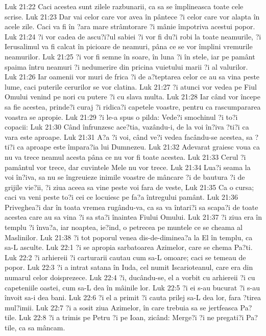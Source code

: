 Luk 21:22  Caci acestea sunt zilele razbunarii, ca sa se împlineasca toate cele scrise.
Luk 21:23  Dar vai celor care vor avea în pântece ?i celor care vor alapta în acele zile. Caci va fi în ?ara mare strâmtorare ?i mânie împotriva acestui popor.
Luk 21:24  ?i vor cadea de ascu?i?ul sabiei ?i vor fi du?i robi la toate neamurile, ?i Ierusalimul va fi calcat în picioare de neamuri, pâna ce se vor împlini vremurile neamurilor.
Luk 21:25  ?i vor fi semne în soare, în luna ?i în stele, iar pe pamânt spaima întru neamuri ?i nedumerire din pricina vuietului marii ?i al valurilor.
Luk 21:26  Iar oamenii vor muri de frica ?i de a?teptarea celor ce au sa vina peste lume, caci puterile cerurilor se vor clatina.
Luk 21:27  ?i atunci vor vedea pe Fiul Omului venind pe nori cu putere ?i cu slava multa.
Luk 21:28  Iar când vor începe sa fie acestea, prinde?i curaj ?i ridica?i capetele voastre, pentru ca rascumpararea voastra se apropie.
Luk 21:29  ?i le-a spus o pilda: Vede?i smochinul ?i to?i copacii:
Luk 21:30  Când înfrunzesc ace?tia, vazându-i, de la voi în?iva ?ti?i ca vara este aproape.
Luk 21:31  A?a ?i voi, când ve?i vedea facându-se acestea, sa ?ti?i ca aproape este împara?ia lui Dumnezeu.
Luk 21:32  Adevarat graiesc voua ca nu va trece neamul acesta pâna ce nu vor fi toate acestea.
Luk 21:33  Cerul ?i pamântul vor trece, dar cuvintele Mele nu vor trece.
Luk 21:34  Lua?i seama la voi în?iva, sa nu se îngreuieze inimile voastre de mâncare ?i de bautura ?i de grijile vie?ii, ?i ziua aceea sa vine peste voi fara de veste,
Luk 21:35  Ca o cursa; caci va veni peste to?i cei ce locuiesc pe fa?a întregului pamânt.
Luk 21:36  Priveghea?i dar în toata vremea rugându-va, ca sa va întari?i sa scapa?i de toate acestea care au sa vina ?i sa sta?i înaintea Fiului Omului.
Luk 21:37  ?i ziua era în templu ?i înva?a, iar noaptea, ie?ind, o petrecea pe muntele ce se cheama al Maslinilor.
Luk 21:38  ?i tot poporul venea dis-de-diminea?a la El în templu, ca sa-L asculte.
Luk 22:1  ?i se apropia sarbatoarea Azimelor, care se chema Pa?ti.
Luk 22:2  ?i arhiereii ?i carturarii cautau cum sa-L omoare; caci se temeau de popor.
Luk 22:3  ?i a intrat satana în Iuda, cel numit Iscarioteanul, care era din numarul celor doisprezece.
Luk 22:4  ?i, ducându-se, el a vorbit cu arhiereii ?i cu capeteniile oastei, cum sa-L dea în mâinile lor.
Luk 22:5  ?i ei s-au bucurat ?i s-au învoit sa-i dea bani.
Luk 22:6  ?i el a primit ?i cauta prilej sa-L dea lor, fara ?tirea mul?imii.
Luk 22:7  ?i a sosit ziua Azimelor, în care trebuia sa se jertfeasca Pa?tile.
Luk 22:8  ?i a trimis pe Petru ?i pe Ioan, zicând: Merge?i ?i ne pregati?i Pa?tile, ca sa mâncam.

